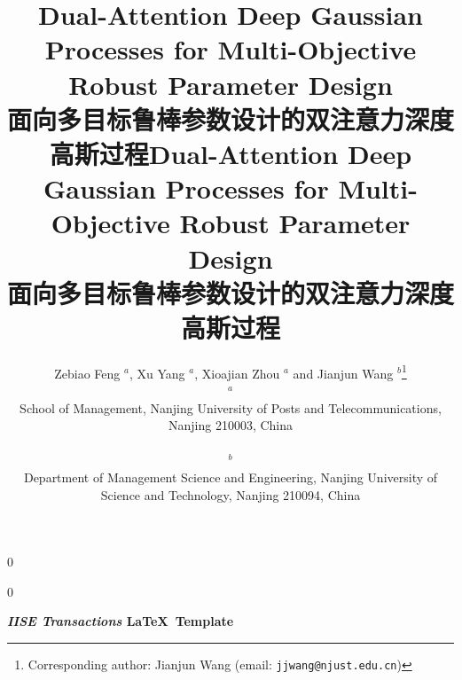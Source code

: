 \documentclass[11pt]{article}
\newcommand{\blind}{0}
\begin{document}
		
		\def\spacingset#1{\renewcommand{\baselinestretch}%
			{#1}\small\normalsize} \spacingset{1}
		
	\blind
	{
		\title{Dual-Attention Deep Gaussian Processes for Multi-Objective Robust Parameter Design\\[0.5ex]\large 面向多目标鲁棒参数设计的双注意力深度高斯过程}
		\maketitle
	} \fi
	
		
		\blind
		{

            \title{Dual-Attention Deep Gaussian Processes for Multi-Objective Robust Parameter Design\\[0.5ex]\large 面向多目标鲁棒参数设计的双注意力深度高斯过程}
			\author{Zebiao Feng $^a$, Xu Yang $^a$, Xioajian Zhou $^a$ and Jianjun Wang $^b$\thanks{Corresponding author: Jianjun Wang (email: \texttt{jjwang@njust.edu.cn})} \\
				$^a$ \parbox{1\textwidth}{School of Management, Nanjing University of Posts and Telecommunications, Nanjing 210003, China} \\
				$^b$ \parbox{1\textwidth}{Department of Management Science and Engineering, Nanjing University of Science and Technology, Nanjing 210094, China}}
			
\bigskip
			\bigskip
			\bigskip
			\begin{center}
				{\LARGE\bf \emph{IISE Transactions} \LaTeX \ Template}
			\end{center}
			\medskip
		} \fi
		\bigskip
		
\end{document}
